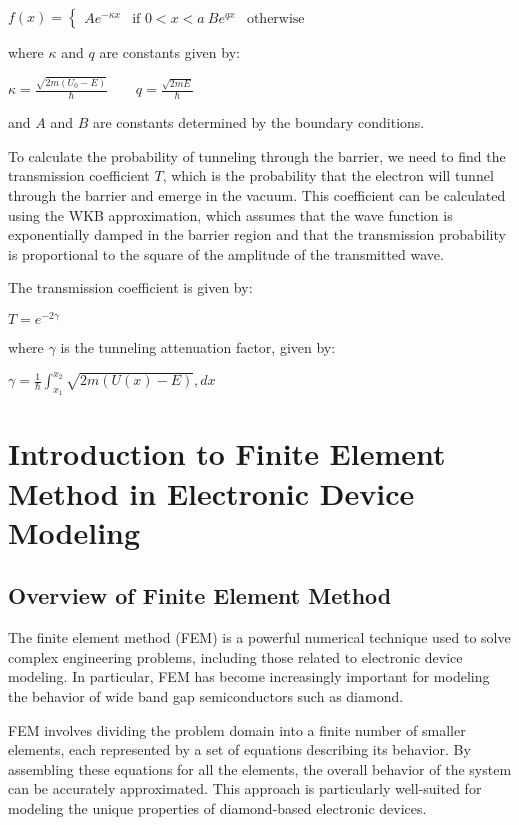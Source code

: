 $ f(x) = \begin{cases} A e^{-\kappa x} &\text{if } 0 < x < a \ B e^{qx} &\text{otherwise} \end{cases} $

where $\kappa$ and $q$ are constants given by:

$ \kappa = \frac{\sqrt{2m(U_0-E)}}{\hbar} \qquad q = \frac{\sqrt{2mE}}{\hbar} $

and $A$ and $B$ are constants determined by the boundary conditions.

To calculate the probability of tunneling through the barrier, we need to find the transmission coefficient $T$, which is the probability that the electron will tunnel through the barrier and emerge in the vacuum. This coefficient can be calculated using the WKB approximation, which assumes that the wave function is exponentially damped in the barrier region and that the transmission probability is proportional to the square of the amplitude of the transmitted wave.

The transmission coefficient is given by:

$ T = e^{-2\gamma} $

where $\gamma$ is the tunneling attenuation factor, given by:

$ \gamma = \frac{1}{\hbar} \int_{x_1}^{x_2} \sqrt{2m(U(x)-E)},dx $

\section{Introduction to Finite Element Method in Electronic Device Modeling}

\subsection{Overview of Finite Element Method}

The finite element method (FEM) is a powerful numerical technique used to solve complex engineering problems, including those related to electronic device modeling. In particular, FEM has become increasingly important for modeling the behavior of wide band gap semiconductors such as diamond.

FEM involves dividing the problem domain into a finite number of smaller elements, each represented by a set of equations describing its behavior. By assembling these equations for all the elements, the overall behavior of the system can be accurately approximated. This approach is particularly well-suited for modeling the unique properties of diamond-based electronic devices.

